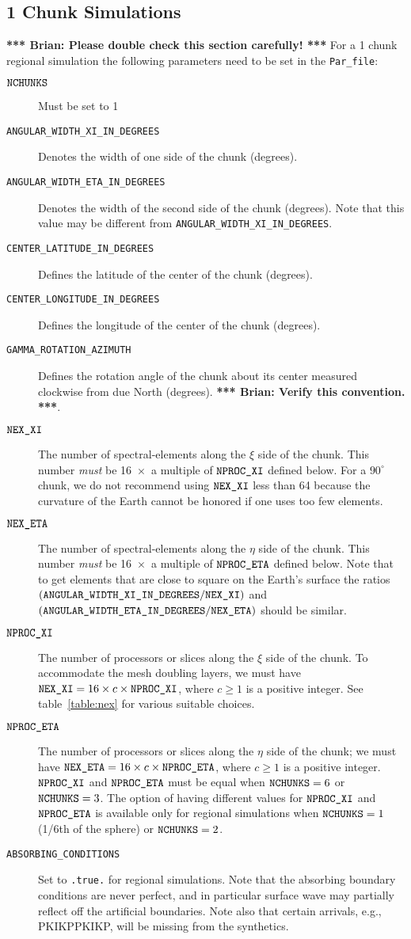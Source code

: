 \documentclass[onecolumn]{article}
\newcommand{\tobrian}[1]{\textbf{*** Brian: #1 ***}}
\newcommand{\nexxi}{\mbox{\texttt{NEX\_XI}}}
\newcommand{\nexeta}{\mbox{\texttt{NEX\_ETA}}}
\newcommand{\nprocxi}{\mbox{\texttt{NPROC\_XI}}}
\newcommand{\nproceta}{\mbox{\texttt{NPROC\_ETA}}}
\newcommand{\nchunks}{\mbox{\texttt{NCHUNKS}}}
\begin{document}
\subsection{1 Chunk Simulations}

\tobrian{Please double check this section carefully!}
For a 1 chunk regional simulation the following parameters need to be set
in the \texttt{Par\_file}:
\begin{description}
\item[$\nchunks$] Must be set to 1
\item[\texttt{ANGULAR\_WIDTH\_XI\_IN\_DEGREES}] Denotes the width of
one side of the chunk (degrees).
\item[\texttt{ANGULAR\_WIDTH\_ETA\_IN\_DEGREES}] Denotes the width of
the second side of the chunk (degrees).
Note that this value may be different from
\texttt{ANGULAR\_WIDTH\_XI\_IN\_DEGREES}.
\item[\texttt{CENTER\_LATITUDE\_IN\_DEGREES}] Defines the latitude of the
center of the chunk (degrees).
\item[\texttt{CENTER\_LONGITUDE\_IN\_DEGREES}] Defines the longitude of the
center of the chunk (degrees).
\item[\texttt{GAMMA\_ROTATION\_AZIMUTH}] Defines the rotation angle of the
chunk about its center measured clockwise from due North (degrees).
\tobrian{Verify this convention.}.
\item[$\nexxi$] The number of spectral-elements along the
$\xi$ side of the chunk.
This number \textit{must} be 16~$\times$~a multiple of $\nprocxi$ defined below.
For a $90^\circ$ chunk,
we do not recommend using $\nexxi$ less than 64 because
the curvature of the Earth cannot be honored if one uses too few elements.
\item[$\nexeta$] The number of spectral-elements along the
$\eta$ side of the chunk.
This number \textit{must} be 16~$\times$~a multiple of $\nproceta$ defined below.
Note that to get elements that are close to square on the Earth's surface the ratios
$(\texttt{ANGULAR\_WIDTH\_XI\_IN\_DEGREES}/\nexxi)$
and
$(\texttt{ANGULAR\_WIDTH\_ETA\_IN\_DEGREES}/\nexeta)$
should be similar.
\item[$\nprocxi$] The number of processors or slices along the $\xi$ side of the
chunk.
To accommodate the mesh doubling layers,
we must have $\nexxi=16\times c\times \nprocxi$, where
$c\ge1$ is a positive integer.
See table~\ref{table:nex} for various suitable choices.
\item[$\nproceta$] The number of processors or slices along the $\eta$ side of the
chunk;
we must have $\nexeta=16\times c\times \nproceta$, where
$c\ge1$ is a positive integer.
$\nprocxi$ and $\nproceta$ must be equal when $\nchunks = 6$ or
$\nchunks = 3$. The option of having different values for $\nprocxi$
and $\nproceta$ is available only for regional simulations
when $\nchunks = 1$ (1/6th of the sphere)
or $\nchunks = 2$.
\item[\texttt{ABSORBING\_CONDITIONS}] Set to \texttt{.true.} for regional
simulations.
Note that the absorbing boundary conditions are never perfect, and in particular
surface wave may partially reflect off the artificial boundaries.
Note also that certain arrivals, e.g., PKIKPPKIKP, will be missing from
the synthetics.
\end{description}
\end{document}

